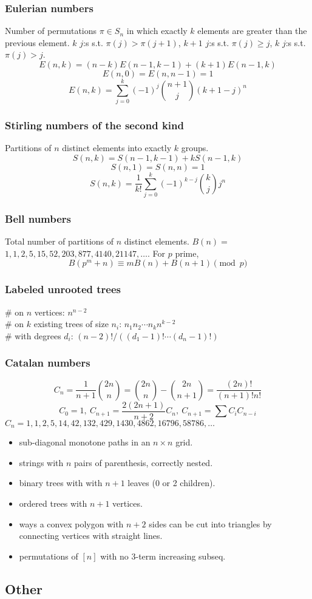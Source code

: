   \subsubsection{Eulerian numbers}
    Number of permutations $\pi \in S_n$ in which exactly $k$ elements are greater than the previous element. $k$ $j$:s s.t. $\pi(j)>\pi(j+1)$, $k+1$ $j$:s s.t. $\pi(j)\geq j$, $k$ $j$:s s.t. $\pi(j)>j$.
    $$E(n,k) = (n-k)E(n-1,k-1) + (k+1)E(n-1,k)$$
    $$E(n,0) = E(n,n-1) = 1$$
    $$E(n,k) = \sum_{j=0}^k(-1)^j\binom{n+1}{j}(k+1-j)^n$$

  \subsubsection{Stirling numbers of the second kind}
    Partitions of $n$ distinct elements into exactly $k$ groups.
    $$S(n,k) = S(n-1,k-1) + k S(n-1,k)$$
    $$S(n,1) = S(n,n) = 1$$
    $$S(n,k) = \frac{1}{k!}\sum_{j=0}^k (-1)^{k-j}\binom{k}{j}j^n$$

  \subsubsection{Bell numbers}
    Total number of partitions of $n$ distinct elements. $B(n) =$
    $1, 1, 2, 5, 15, 52, 203, 877, 4140, 21147, \dots$. For $p$ prime,
    \[ B(p^m+n)\equiv mB(n)+B(n+1) \pmod{p} \]

  \subsubsection{Labeled unrooted trees}
    \# on $n$ vertices: $n^{n-2}$ \\
    \# on $k$ existing trees of size $n_i$: $n_1n_2\cdots n_k n^{k-2}$ \\
    \# with degrees $d_i$: $(n-2)! / ((d_1-1)! \cdots (d_n-1)!)$

  \subsubsection{Catalan numbers}
    \[ C_n=\frac{1}{n+1}\binom{2n}{n}= \binom{2n}{n}-\binom{2n}{n+1} = \frac{(2n)!}{(n+1)!n!} \]
    \[ C_0=1,\ C_{n+1} = \frac{2(2n+1)}{n+2}C_n,\ C_{n+1}=\sum C_iC_{n-i} \]
    ${C_n = 1, 1, 2, 5, 14, 42, 132, 429, 1430, 4862, 16796, 58786, \dots}$
    \begin{itemize}[noitemsep]
      \item sub-diagonal monotone paths in an $n\times n$ grid.
      \item strings with $n$ pairs of parenthesis, correctly nested.
      \item binary trees with with $n+1$ leaves (0 or 2 children).
      \item ordered trees with $n+1$ vertices.
      \item ways a convex polygon with $n+2$ sides can be cut into triangles by connecting vertices with straight lines.
      \item permutations of $[n]$ with no 3-term increasing subseq.
    \end{itemize}

\subsection{Other}
